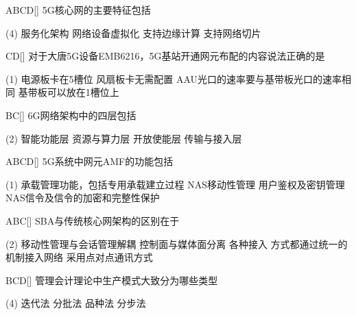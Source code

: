 \begin{choice}{\;ABCD\;}[]
    5G核心网的主要特征包括
    \begin{tasks}(4)
        \task 服务化架构
        \task 网络设备虚拟化
        \task 支持边缘计算
        \task 支持网络切片
    \end{tasks}
\end{choice}

\begin{choice}{\;CD\;}[]
    对于大唐5G设备EMB6216，5G基站开通网元布配的内容说法正确的是
    \begin{tasks}(1)
        \task 电源板卡在5槽位
        \task 风扇板卡无需配置
        \task  AAU光口的速率要与基带板光口的速率相同
        \task 基带板可以放在1槽位上
    \end{tasks}
\end{choice}

\begin{choice}{\;BC\;}[]
    6G网络架构中的四层包括
    \begin{tasks}(2)
        \task 智能功能层
        \task 资源与算力层
        \task 开放使能层
        \task 传输与接入层
    \end{tasks}
\end{choice}

\begin{choice}{\;ABCD\;}[]
    5G系统中网元AMF的功能包括
    \begin{tasks}(1)
        \task 承载管理功能，包括专用承载建立过程
        \task NAS移动性管理
        \task 用户鉴权及密钥管理
        \task NAS信令及信令的加密和完整性保护
    \end{tasks}
\end{choice}

\begin{choice}{\;ABC\;}[]
    SBA与传统核心网架构的区别在于
    \begin{tasks}(2)
        \task 移动性管理与会话管理解耦
        \task 控制面与媒体面分离
        \task 各种接入  方式都通过统一的机制接入网络
        \task 采用点对点通讯方式
    \end{tasks}
\end{choice}

\begin{choice}{\;BCD\;}[]
    管理会计理论中生产模式大致分为哪些类型
    \begin{tasks}(4)
        \task 迭代法
        \task 分批法
        \task 品种法
        \task 分步法
    \end{tasks}
\end{choice}

